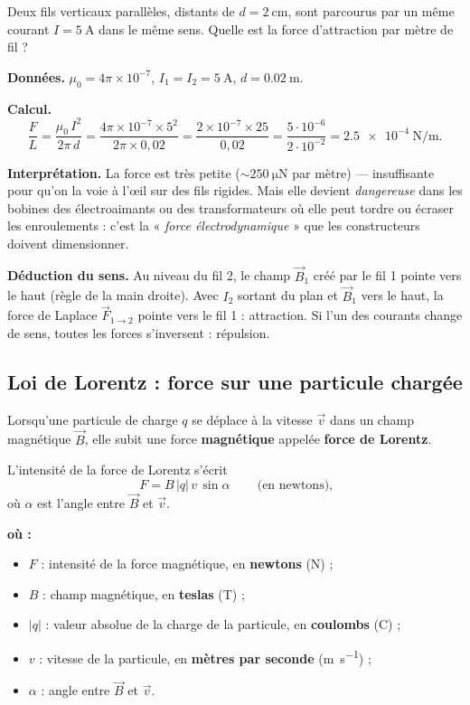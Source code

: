 \documentclass[11pt,a4paper]{article}
\newenvironment{ou}{%
  \par\smallskip\noindent\textbf{où :}\nopagebreak
  \begin{itemize}[leftmargin=1.8em,topsep=2pt,itemsep=1.5pt,parsep=0pt]}%
  {\end{itemize}}
\newcommand{\Bvec}{\vec{B}}
\newcommand{\Fvec}{\vec{F}}
\newcommand{\vvec}{\vec{v}}
\begin{document}
\begin{exemple}
Deux fils verticaux parallèles, distants de $d=\SI{2}{\centi\metre}$, sont parcourus par un même
courant $I=\SI{5}{\ampere}$ dans le même sens. Quelle est la force d'attraction par mètre de fil ?

\smallskip
\textbf{Données.} $\mu_0=4\pi\times 10^{-7}$, $I_1=I_2=\SI{5}{\ampere}$, $d=\SI{0.02}{\metre}$.

\textbf{Calcul.}
\[ \dfrac{F}{L} = \dfrac{\mu_0\, I^2}{2\pi\, d}
   = \dfrac{4\pi\times 10^{-7}\times 5^2}{2\pi\times 0{,}02}
   = \dfrac{2\times 10^{-7}\times 25}{0{,}02}
   = \dfrac{5\cdot 10^{-6}}{2\cdot 10^{-2}}
   = \SI{2.5e-4}{\newton\per\metre}. \]

\textbf{Interprétation.} La force est très petite ($\sim\SI{250}{\micro\newton}$ par mètre) —
insuffisante pour qu'on la voie à l'œil sur des fils rigides. Mais elle devient \emph{dangereuse}
dans les bobines des électroaimants ou des transformateurs où elle peut tordre ou écraser les
enroulements : c'est la « \emph{force électrodynamique} » que les constructeurs doivent dimensionner.

\textbf{Déduction du sens.} Au niveau du fil 2, le champ $\Bvec_1$ créé par le fil 1 pointe vers le
haut (règle de la main droite). Avec $I_2$ sortant du plan et $\Bvec_1$ vers le haut, la force de
Laplace $\Fvec_{1\to 2}$ pointe vers le fil 1 : attraction. Si l'un des courants change de sens,
toutes les forces s'inversent : répulsion.
\end{exemple}

\subsection{Loi de Lorentz : force sur une particule chargée}

\begin{definition}
Lorsqu'une particule de charge $q$ se déplace à la vitesse $\vvec$ dans un champ magnétique $\Bvec$,
elle subit une force \textbf{magnétique} appelée \textbf{force de Lorentz}.
\end{definition}

\begin{formule}
L'intensité de la force de Lorentz s'écrit
\[ \boxed{\,F = B\, |q|\, v\, \sin\alpha\,} \qquad\text{(en newtons),} \]
où $\alpha$ est l'angle entre $\Bvec$ et $\vvec$.
\begin{ou}
  \item $F$ : intensité de la force magnétique, en \textbf{newtons} (\si{\newton}) ;
  \item $B$ : champ magnétique, en \textbf{teslas} (\si{\tesla}) ;
  \item $|q|$ : valeur absolue de la charge de la particule, en \textbf{coulombs} (\si{\coulomb}) ;
  \item $v$ : vitesse de la particule, en \textbf{mètres par seconde} (\si{\metre\per\second}) ;
  \item $\alpha$ : angle entre $\Bvec$ et $\vvec$.
\end{ou}
\end{formule}
\end{document}
